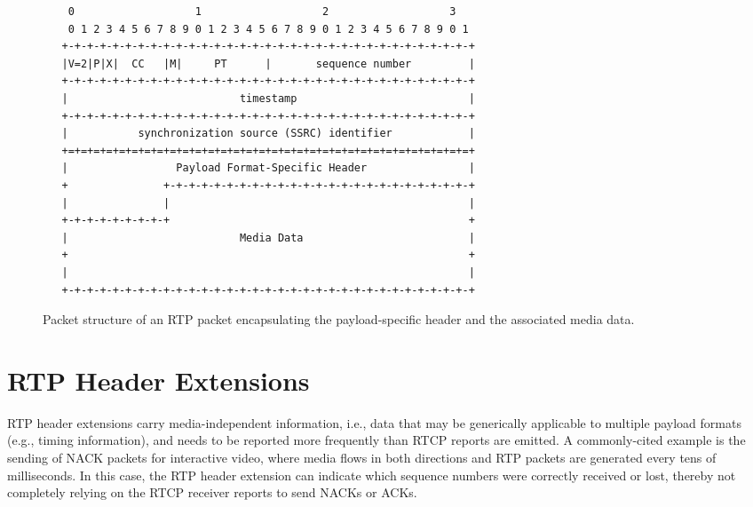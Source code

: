 \begin{figure}[!h]
\begin{spacing}{0.5}
{\footnotesize
\begin{verbatim}
    0                   1                   2                   3
    0 1 2 3 4 5 6 7 8 9 0 1 2 3 4 5 6 7 8 9 0 1 2 3 4 5 6 7 8 9 0 1
   +-+-+-+-+-+-+-+-+-+-+-+-+-+-+-+-+-+-+-+-+-+-+-+-+-+-+-+-+-+-+-+-+
   |V=2|P|X|  CC   |M|     PT      |       sequence number         |
   +-+-+-+-+-+-+-+-+-+-+-+-+-+-+-+-+-+-+-+-+-+-+-+-+-+-+-+-+-+-+-+-+
   |                           timestamp                           |
   +-+-+-+-+-+-+-+-+-+-+-+-+-+-+-+-+-+-+-+-+-+-+-+-+-+-+-+-+-+-+-+-+
   |           synchronization source (SSRC) identifier            |
   +=+=+=+=+=+=+=+=+=+=+=+=+=+=+=+=+=+=+=+=+=+=+=+=+=+=+=+=+=+=+=+=+
   |                 Payload Format-Specific Header                |
   +               +-+-+-+-+-+-+-+-+-+-+-+-+-+-+-+-+-+-+-+-+-+-+-+-+
   |               |                                               |
   +-+-+-+-+-+-+-+-+                                               +
   |                           Media Data                          |
   +                                                               +
   |                                                               |
   +-+-+-+-+-+-+-+-+-+-+-+-+-+-+-+-+-+-+-+-+-+-+-+-+-+-+-+-+-+-+-+-+
\end{verbatim}
}
\end{spacing}
\caption{Packet structure of an RTP packet encapsulating the
payload-specific header and the associated media data.}
\label{fig:3:pt.fmt}
\end{figure}


\section{RTP Header Extensions}

RTP header extensions carry media-independent information, i.e., data that may
be generically applicable to multiple payload formats (e.g., timing
information), and needs to be reported more frequently than RTCP reports are
emitted. A commonly-cited example is the sending of NACK packets for interactive video,
where media flows in both directions and RTP packets are generated every tens
of milliseconds. In this case, the RTP header extension can indicate which sequence numbers
were correctly received or lost, thereby not completely relying on the RTCP
receiver reports to send NACKs or ACKs.

